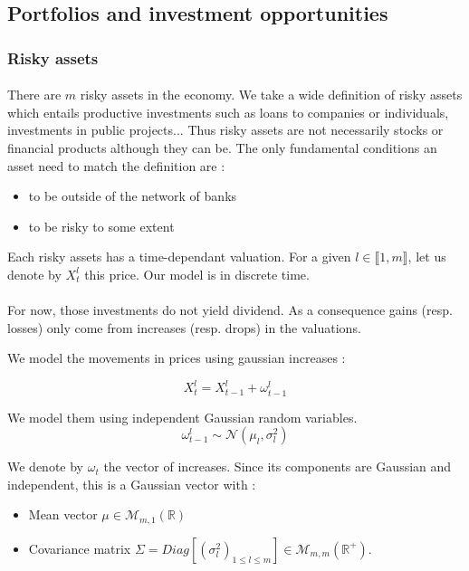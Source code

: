 \documentclass{article}
\begin{document}
\subsection{Portfolios and investment opportunities}\label{portfolio and investment opportunities}

\subsubsection{Risky assets}

\paragraph{}
There are $m$ risky assets in the economy. We take a wide definition of risky assets which entails productive investments such as loans to companies or individuals, investments in public projects... Thus risky assets are not necessarily stocks or financial products although they can be. The only fundamental conditions an asset need to match the definition are :
\begin{itemize}
    \item to be outside of the network of banks
    \item to be risky to some extent
\end{itemize}

Each risky assets has a time-dependant valuation. For a given $l \in \llbracket 1, m \rrbracket $, let us denote by $X_t^l$ this price. Our model is in discrete time.

\paragraph{}
For now, those investments do not yield dividend. As a consequence gains (resp. losses) only come from increases (resp. drops) in the valuations. 


We model the movements in prices using gaussian increases : 

$$ X_t^l = X_{t-1}^l + \omega_{t-1}^l$$

We model them using independent Gaussian random variables.
    $$\omega_{t-1}^l \sim \mathcal{N}(\mu_l, \sigma_l^2)$$
    
We denote by $\omega_t$ the vector of increases.
Since its components are Gaussian and independent, this is a Gaussian vector with :
    \begin{itemize}
        \item Mean vector $\mu \in \mathcal{M}_{m, 1}(\mathbb{R})$
        \item Covariance matrix $\Sigma = Diag[(\sigma_l^2)_{1\leq l \leq m}] \in \mathcal{M}_{m, m}(\mathbb{R}^+)$.
    \end{itemize}
    
\end{document}
